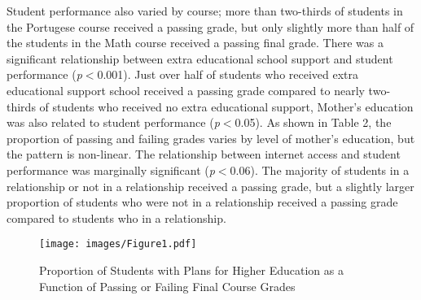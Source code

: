 \documentclass[sigconf]{acmart}
\begin{document}
Student performance also varied by course; more than two-thirds of students in 
the Portugese course received a passing grade, but only slightly more than half 
of the students in the Math course received a passing final grade. There was 
a significant relationship between extra educational school support and 
student performance (\textit{p}$<$0.001). Just over half of students who 
received extra educational support school received a passing grade compared
to nearly two-thirds of students who received no extra educational support,
Mother's education was also related to student performance (\textit{p}$<$0.05). 
As shown in Table 2, the proportion of passing and failing grades varies by 
level of mother's education, but the pattern is non-linear. The relationship
between internet access and student performance was marginally significant 
(\textit{p}$<$0.06). The majority of students in a relationship or not in a
relationship received a passing grade, but a slightly larger proportion of 
students who were not in a relationship received a passing grade compared 
to students who in a relationship. 


\begin{figure}[!ht]
  \centering\texttt{[image: images/Figure1.pdf]}
  \caption{Proportion of Students with Plans for Higher Education as a 
  Function of Passing or Failing Final Course Grades}
  \label{f:Figure1}
\end{figure}

\end{document}
